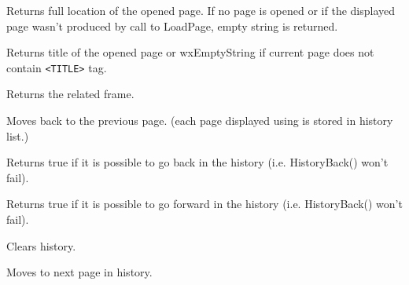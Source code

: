 \label{wxhtmlwindowgetopenedpage}


Returns full location of the opened page. If no page is opened or if the displayed page wasn't
produced by call to LoadPage, empty string is returned.

\label{wxhtmlwindowgetopenedpagetitle}


Returns title of the opened page or wxEmptyString if current page does not contain {\tt <TITLE>} tag.

\label{wxhtmlwindowgetrelatedframe}


Returns the related frame.

\label{wxhtmlwindowhistoryback}


Moves back to the previous page. (each page displayed using 
 is stored in history list.)

\label{wxhtmlwindowhistorycanback}


Returns true if it is possible to go back in the history (i.e. HistoryBack()
won't fail).

\label{wxhtmlwindowhistorycanforward}


Returns true if it is possible to go forward in the history (i.e. HistoryBack()
won't fail).


\label{wxhtmlwindowhistoryclear}


Clears history.

\label{wxhtmlwindowhistoryforward}


Moves to next page in history.

\label{wxhtmlwindowloadfile}

